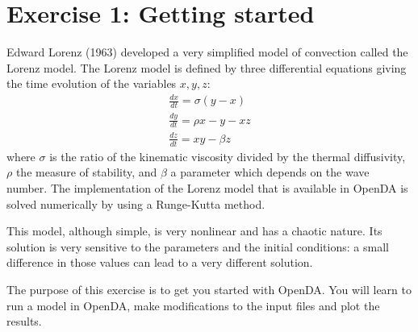 \section{Exercise 1: Getting started}

Edward Lorenz (1963) developed
a very simplified model of convection called the Lorenz model. The Lorenz model
is defined by three differential equations giving the time evolution of the
variables $x,y,z$:
\begin{eqnarray}
   \frac{dx}{dt}=\sigma(y-x) \\
   \frac{dy}{dt}=\rho x - y -x z \\
   \frac{dz}{dt}=x y - \beta z
\end{eqnarray}
where $\sigma$ is the ratio of the kinematic viscosity divided by the thermal
diffusivity, $\rho$ the measure of stability, and $\beta$ a parameter which
depends on the wave number.
The implementation of the Lorenz model that is available in OpenDA is solved numerically by using a Runge-Kutta method.

This model, although simple, is very nonlinear and has a chaotic nature.  Its
solution is very sensitive to the parameters and the initial conditions: a
small difference in those values can lead to a very different solution.

The purpose of this exercise is to get you started with OpenDA. You will learn
to run a model in OpenDA, make modifications to the input files and plot the
results.

